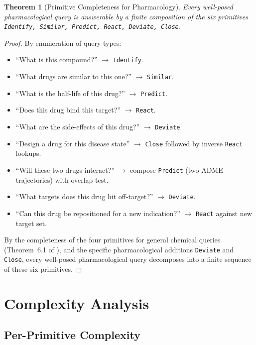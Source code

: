 \documentclass[11pt,twocolumn,a4paper]{article}
\newtheorem{theorem}{Theorem}[section]
\theoremstyle{definition}
\theoremstyle{remark}
\begin{document}
\begin{theorem}[Primitive Completeness for Pharmacology]
\label{thm:primitive_completeness_pharm}
Every well-posed pharmacological query is answerable by a finite composition of the six primitives \texttt{Identify, Similar, Predict, React, Deviate, Close}.
\end{theorem}

\begin{proof}
By enumeration of query types:
\begin{itemize}[nosep,leftmargin=*]
\item ``What is this compound?'' $\to$ \texttt{Identify}.
\item ``What drugs are similar to this one?'' $\to$ \texttt{Similar}.
\item ``What is the half-life of this drug?'' $\to$ \texttt{Predict}.
\item ``Does this drug bind this target?'' $\to$ \texttt{React}.
\item ``What are the side-effects of this drug?'' $\to$ \texttt{Deviate}.
\item ``Design a drug for this disease state'' $\to$ \texttt{Close} followed by inverse \texttt{React} lookups.
\item ``Will these two drugs interact?'' $\to$ compose \texttt{Predict} (two ADME trajectories) with overlap test.
\item ``What targets does this drug hit off-target?'' $\to$ \texttt{Deviate}.
\item ``Can this drug be repositioned for a new indication?'' $\to$ \texttt{React} against new target set.
\end{itemize}
By the completeness of the four primitives for general chemical queries (Theorem~6.1 of \citep{sachikonye2025d}), and the specific pharmacological additions \texttt{Deviate} and \texttt{Close}, every well-posed pharmacological query decomposes into a finite sequence of these six primitives.
\end{proof}

\section{Complexity Analysis}
\label{sec:complexity}

\subsection{Per-Primitive Complexity}
\end{document}
